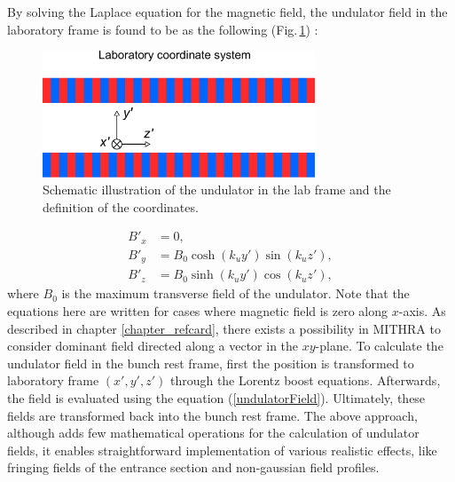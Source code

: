 By solving the Laplace equation for the magnetic field, the undulator field in the laboratory frame is found to be as the following (Fig.\,\ref{FDTDPICFig3}) \cite{FEL2}:
%
\begin{figure}
\centering
\includegraphics[width=3.2in]{./MITHRA_FDTDPIC/Fig3/Fig3.pdf}
\caption{Schematic illustration of the undulator in the lab frame and the definition of the coordinates.}
\label{FDTDPICFig3}
\end{figure}
%
\begin{align}
\label{undulatorField}
B'_x & = 0, \nonumber \\
B'_y & = B_0 \cosh(k_uy')\sin(k_uz'), \\
B'_z & = B_0 \sinh(k_uy')\cos(k_uz'), \nonumber
\end{align}
%
where $B_0$ is the maximum transverse field of the undulator.
%
Note that the equations here are written for cases where magnetic field is zero along $x$-axis.
%
As described in chapter \ref{chapter_refcard}, there exists a possibility in MITHRA to consider dominant field directed along a vector in the $xy$-plane.
%
To calculate the undulator field in the bunch rest frame, first the position is transformed to laboratory frame $(x',y',z')$ through the Lorentz boost equations.
%
Afterwards, the field is evaluated using the equation (\ref{undulatorField}).
%
Ultimately, these fields are transformed back into the bunch rest frame.
%
The above approach, although adds few mathematical operations for the calculation of undulator fields, it enables straightforward implementation of various realistic effects, like fringing fields of the entrance section and non-gaussian field profiles.

